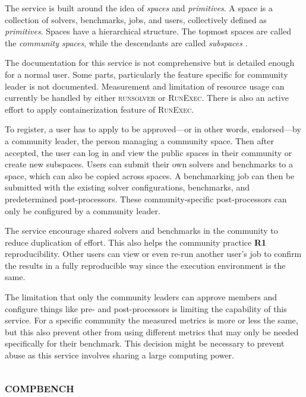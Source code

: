 The service is built around the idea of \emph{spaces} and \emph{primitives}.
A space is a collection of solvers, benchmarks, jobs, and users, collectively defined as \emph{primitives}.
Spaces have a hierarchical structure.
The topmost spaces are called the \emph{community spaces}, while the descendants are called \emph{subspaces} \citep{stumpStarExecCrossCommunityInfrastructure2014}.

The documentation for this service is not comprehensive but is detailed enough for a normal user.
Some parts, particularly the feature specific for community leader is not documented.
Measurement and limitation of resource usage can currently be handled by either \textsc{runsolver} or \textsc{RunExec}.
There is also an active effort to apply containerization feature of \textsc{RunExec}.

To register, a user has to apply to be approved---or in other words, endorsed---by a community leader, the person managing a community space.
Then after accepted, the user can log in and view the public spaces in their community or create new subspaces.
Users can submit their own solvers and benchmarks to a space, which can also be copied across spaces.
A benchmarking job can then be submitted with the existing solver configurations, benchmarks, and predetermined post-processors.
These community-specific post-processors can only be configured by a community leader.

The service encourage shared solvers and benchmarks in the community to reduce duplication of effort.
This also helps the community practice \textbf{R1} reproducibility.
Other users can view or even re-run another user's job to confirm the results in a fully reproducible way since the execution environment is the same.

The limitation that only the community leaders can approve members and configure things like pre- and post-processors is limiting the capability of this service.
For a specific community the measured metrics is more or less the same, but this also prevent other from using different metrics that may only be needed specifically for their benchmark.
This decision might be necessary to prevent abuse as this service involves sharing a large computing power.

\subsection{\textsc{compbench}}


